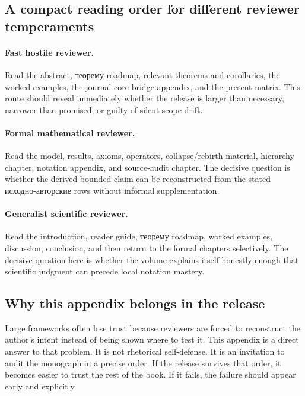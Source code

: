 \subsection{A compact reading order for different reviewer temperaments}

\paragraph{Fast hostile reviewer.}
Read the abstract, теорему roadmap, relevant theorems and corollaries, the worked examples,
the journal-core bridge appendix, and the present matrix. This route should reveal immediately
whether the release is larger than necessary, narrower than promised, or guilty of silent scope
drift.

\paragraph{Formal mathematical reviewer.}
Read the model, results, axioms, operators, collapse/rebirth material, hierarchy chapter,
notation appendix, and source-audit chapter. The decisive question is whether the derived bounded
claim can be reconstructed from the stated исходно-авторские rows without informal supplementation.

\paragraph{Generalist scientific reviewer.}
Read the introduction, reader guide, теорему roadmap, worked examples, discussion, conclusion,
and then return to the formal chapters selectively. The decisive question here is whether the
volume explains itself honestly enough that scientific judgment can precede local notation
mastery.

\subsection{Why this appendix belongs in the release}

Large frameworks often lose trust because reviewers are forced to reconstruct the author's intent
instead of being shown where to test it. This appendix is a direct answer to that problem. It is
not rhetorical self-defense. It is an invitation to audit the monograph in a precise order.
If the release survives that order, it becomes easier to trust the rest of the book. If it fails,
the failure should appear early and explicitly.

\clearpage
